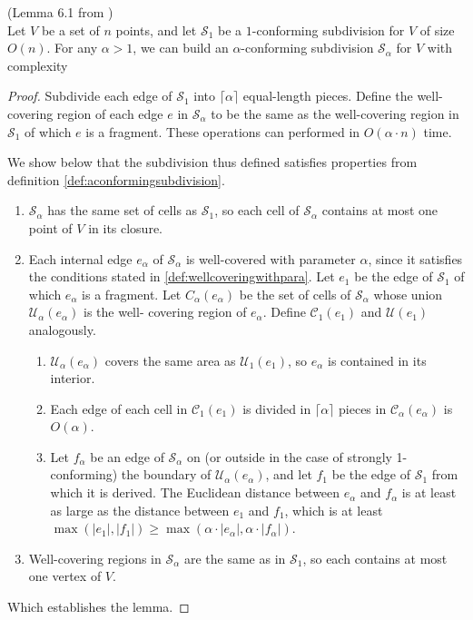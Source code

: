 \begin{Lemma} (Lemma 6.1 from \cite{HershbergerS99}) \label{lemma:6.1HershbergerS99} \\
Let $V$ be a set of $n$ points, and let $\mathcal{S}_1$ be a $1$-conforming 
subdivision for $V$ of size $O(n)$. For any $\alpha>1$, we can build an $\alpha$-conforming 
subdivision $\mathcal{S}_\alpha$ for $V$ with complexity
\end{Lemma}

\begin{proof} Subdivide each edge of $\mathcal{S}_1$ into $\lceil \alpha
	\rceil$ equal-length pieces. Define the well-covering region of each edge
	$e$ in $\mathcal{S}_\alpha$ to be the same as the well-covering region in
	$\mathcal{S}_1$ of which $e$ is a fragment. These operations can performed
	in $O(\alpha\cdot n)$ time. 

We show below that the subdivision thus defined satisfies properties from
	definition \ref{def:aconformingsubdivision}. 

\begin{enumerate}
    \item $\mathcal{S}_\alpha$ has the same set of cells as $\mathcal{S}_1$, so each cell of 
    	  $\mathcal{S}_\alpha$ contains at most one point of $V$ in its closure.
    \item Each internal edge $e_\alpha$ of $\mathcal{S}_\alpha$ is well-covered with 
    	  parameter $\alpha$, since it satisfies the conditions stated in 
          \ref{def:wellcoveringwithpara}. Let $e_1$ be the edge of $\mathcal{S}_1$ of which 
          $e_\alpha$ is a fragment. Let $C_\alpha(e_\alpha)$ be the set of cells of 
          $\mathcal{S}_\alpha$ whose union $\mathcal{U}_\alpha(e_\alpha)$ is the well-
          covering region of $e_\alpha$. Define $\mathcal{C}_1(e_1)$ and $\mathcal{U}(e_1)$ 
          analogously.
    \begin{enumerate}
    	\item $\mathcal{U}_\alpha(e_\alpha)$ covers the same area as $\mathcal{U}_1(e_1)$, 
        	  so $e_\alpha$ is contained in its interior.
        \item Each edge of each cell in $\mathcal{C}_1(e_1)$ is divided in $\lceil \alpha 
        	  \rceil$ pieces in $\mathcal{C}_\alpha(e_\alpha)$ is $O(\alpha)$.
        \item Let $f_\alpha$ be an edge of $\mathcal{S}_\alpha$ on (or outside in the case 
        	  of strongly 1-conforming) the boundary of $\mathcal{U}_\alpha(e_\alpha)$, and 
              let $f_1$ be the edge of $\mathcal{S}_1$ from which it is derived. The 
              Euclidean distance between $e_\alpha$ and $f_\alpha$ is at least as large as 
              the distance between $e_1$ and $f_1$, which is at least $\max(|e_1|,|f_1|)\geq 
              \max(\alpha\cdot|e_\alpha|, \alpha\cdot|f_\alpha|)$.
    \end{enumerate}
    \item Well-covering regions in $\mathcal{S}_\alpha$ are the same as in $\mathcal{S}_1$, 
    	  so each contains at most one vertex of $V$.
\end{enumerate}
Which establishes the lemma.
\end{proof}

